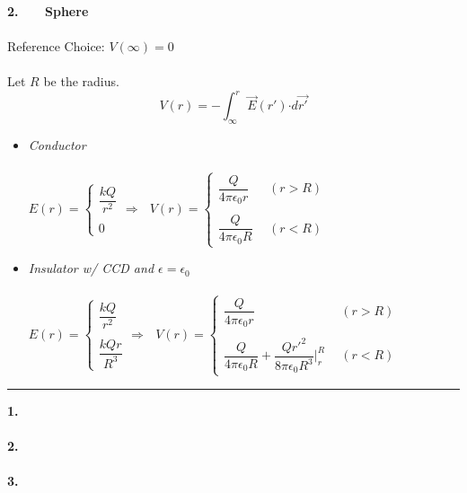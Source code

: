 \documentclass[12pt]{article}
\newcommand*{\dotP}{\boldsymbol \cdot}		%
\begin{document}
\newpage
\noindent
\begin{minipage}[t]{.61\textwidth}
	\textbf{2. \ \ \ Sphere}\\ \\
	Reference Choice:  \( V(\infty) = 0\) \\ \\
	Let \(R\) be the radius.
	\[ V(r) = - \int_{\infty}^r \vec{E}(r') \dotP d\vec{r'} \]

	\begin{itemize}
		\item \emph{Conductor}\\ \\
		\( E(r) = \begin{cases}
			\dfrac{k Q}{r^2}\\ \\
			0 
		\end{cases} 
		\Rightarrow \ \ \ V(r) = \begin{cases}
			\dfrac{ Q }{4 \pi \epsilon_0 r} & \ \ (r > R)\\ \\
			\dfrac{ Q }{4 \pi \epsilon_0 R} & \ \ (r < R)
		\end{cases} \)
	\end{itemize}
	\begin{itemize}
		\item \emph{Insulator w/ CCD and \(\epsilon = \epsilon_0\)} \\ \\
		\( E(r) = \begin{cases}
			\dfrac{k Q}{r^2}\\ \\
			\dfrac{k Q r}{R^3}
		\end{cases} 
		\Rightarrow \ \ \ V(r) = \begin{cases}
			\dfrac{ Q }{4 \pi \epsilon_0 r} & \ \ (r > R)\\ \\
			\dfrac{ Q }{4 \pi \epsilon_0 R} + \dfrac{Q r'^2}{8 \pi \epsilon_0 R^3} \bigg|_{r}^{R} & \ \ (r < R)
		\end{cases} \)
	\end{itemize}
\end{minipage}
\rule[-300pt]{.5pt}{300pt}
\hspace{0.02\textwidth}
\begin{minipage}[t]{0.4\textwidth}
	\textbf{1. \ \ \ }\\ \\

	
	\hfill \break
	\textbf{2. \ \ \ }\\ \\

	\hfill \break
	\textbf{3. \ \ \ }\\ \\
	
\end{minipage}
\end{document}
